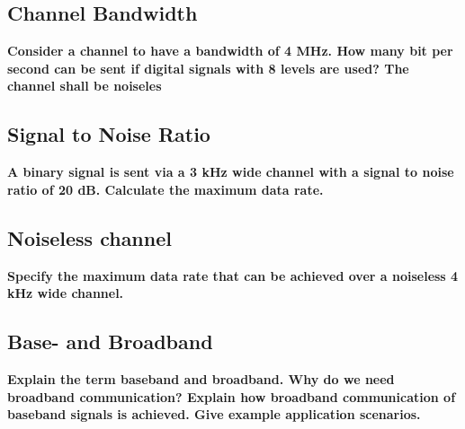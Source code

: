 \documentclass[a4paper,12pt]{article}
\begin{document}
	
\subsection{Channel Bandwidth}
\textbf{Consider a channel to have a bandwidth of 4 MHz. How many bit per second can be sent if digital signals with 8 levels are used? The channel shall be noiseles}

	
\subsection{Signal to Noise Ratio}
\textbf{A binary signal is sent via a 3 kHz wide channel with a signal to noise ratio of 20 dB. Calculate the maximum data rate.}


\subsection{Noiseless channel}
\textbf{Specify the maximum data rate that can be achieved over a noiseless 4 kHz wide channel.}


\subsection{Base- and Broadband}
\textbf{Explain the term baseband and broadband. Why do we need broadband communication? Explain how broadband communication of baseband signals is achieved. Give example application scenarios.}

\end{document}
